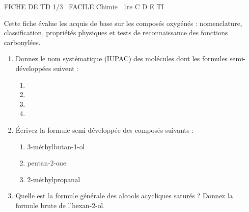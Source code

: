 \documentclass[11pt]{article}
\begin{document}
\begin{tcolorbox}[enhanced,colback=popink,colframe=popink,arc=10pt,boxrule=0pt,left=12pt,right=12pt,top=9pt,bottom=9pt]
{\color{white}\popxbold\small FICHE DE TD 1/3 \textbullet\ FACILE \hfill Chimie \textbullet\ 1re C D E TI\par}
\end{tcolorbox}
\vspace{4pt}
Cette fiche évalue les acquis de base sur les composés oxygénés : nomenclature, classification, propriétés physiques et tests de reconnaissance des fonctions carbonylées.

\begin{exercice}
\begin{enumerate}
    \item Donnez le nom systématique (IUPAC) des molécules dont les formules semi-développées suivent :
    \begin{enumerate}
        \item {}
        \item {}
        \item {}
        \item {}
    \end{enumerate}
    \item Écrivez la formule semi-développée des composés suivants :
    \begin{enumerate}
        \item 3-méthylbutan-1-ol
        \item pentan-2-one
        \item 2-méthylpropanal
    \end{enumerate}
    \item Quelle est la formule générale des alcools acycliques saturés ? Donnez la formule brute de l'hexan-2-ol.
\end{enumerate}
\end{exercice}
\end{document}
